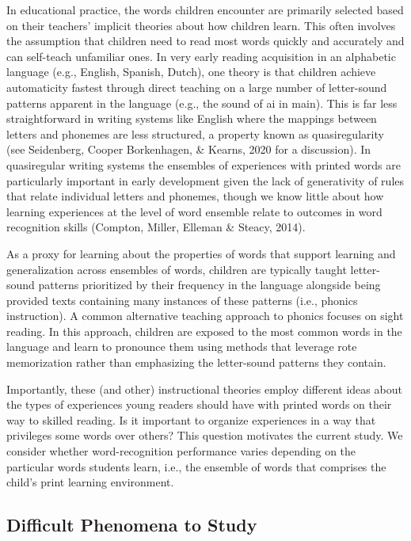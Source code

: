 \documentclass[
  ,man,floatsintext]{apa6}
\begin{document}
In educational practice, the words children encounter are primarily selected based on their teachers' implicit theories about how children learn. This often involves the assumption that children need to read most words quickly and accurately and can self-teach unfamiliar ones. In very early reading acquisition in an alphabetic language (e.g., English, Spanish, Dutch), one theory is that children achieve automaticity fastest through direct teaching on a large number of letter-sound patterns apparent in the language (e.g., the sound of ai in main). This is far less straightforward in writing systems like English where the mappings between letters and phonemes are less structured, a property known as quasiregularity (see Seidenberg, Cooper Borkenhagen, \& Kearns, 2020 for a discussion). In quasiregular writing systems the ensembles of experiences with printed words are particularly important in early development given the lack of generativity of rules that relate individual letters and phonemes, though we know little about how learning experiences at the level of word ensemble relate to outcomes in word recognition skills (Compton, Miller, Elleman \& Steacy, 2014).

As a proxy for learning about the properties of words that support learning and generalization across ensembles of words, children are typically taught letter-sound patterns prioritized by their frequency in the language alongside being provided texts containing many instances of these patterns (i.e., phonics instruction). A common alternative teaching approach to phonics focuses on sight reading. In this approach, children are exposed to the most common words in the language and learn to pronounce them using methods that leverage rote memorization rather than emphasizing the letter-sound patterns they contain.

Importantly, these (and other) instructional theories employ different ideas about the types of experiences young readers should have with printed words on their way to skilled reading. Is it important to organize experiences in a way that privileges some words over others? This question motivates the current study. We consider whether word-recognition performance varies depending on the particular words students learn, i.e., the ensemble of words that comprises the child's print learning environment.

\subsection{Difficult Phenomena to Study}\label{difficult-phenomena-to-study}
\end{document}
